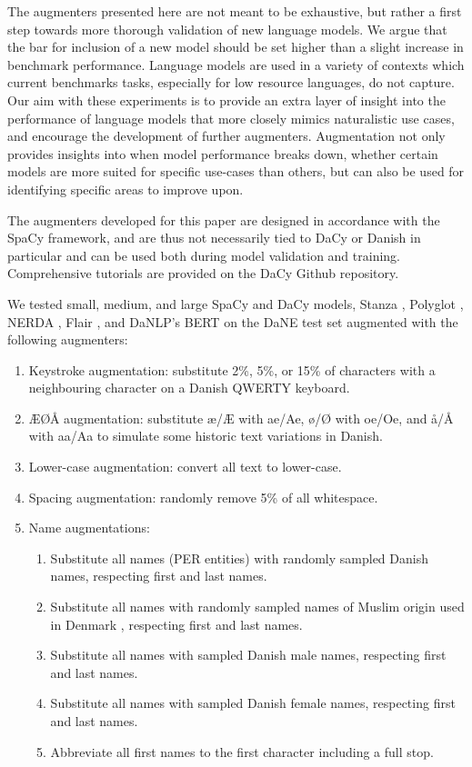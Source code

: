 \documentclass{article}
\begin{document}
The augmenters presented here are not meant to be exhaustive, but rather a first step towards more thorough validation of new language models. We argue that the bar for inclusion of a new model should be set higher than a slight increase in benchmark performance. Language models are used in a variety of contexts which current benchmarks tasks, especially for low resource languages, do not capture. Our aim with these experiments is to provide an extra layer of insight into the performance of language models that more closely mimics naturalistic use cases, and encourage the development of further augmenters. Augmentation not only provides insights into when model performance breaks down, whether certain models are more suited for specific use-cases than others, but can also be used for identifying specific areas to improve upon.

The augmenters developed for this paper are designed in accordance with the SpaCy framework, and are thus not necessarily tied to DaCy or Danish in particular and can be used both during model validation and training. Comprehensive tutorials are provided on the DaCy Github repository.

We tested small, medium, and large SpaCy \parencite{honnibal_spacy_2020} and DaCy models, Stanza \parencite{qi_stanza_2020}, Polyglot \parencite{al-rfou_polyglot_2013}, NERDA \parencite{kjeldgaard_nerda_2020}, Flair \parencite{akbik_flair_2019}, and DaNLP's BERT \parencite{brogaard_pauli_danlp_2021} on the DaNE test set augmented with the following augmenters:

\begin{enumerate}
    \item Keystroke augmentation: substitute 2\%, 5\%, or 15\% of characters with a neighbouring character on a Danish QWERTY keyboard.
    \item ÆØÅ augmentation: substitute æ/Æ with ae/Ae, ø/Ø with oe/Oe, and å/Å with aa/Aa to simulate some historic text variations in Danish.
    \item Lower-case augmentation: convert all text to lower-case.
    \item Spacing augmentation: randomly remove 5\% of all whitespace.
    \item Name augmentations:
    \begin{enumerate}
        \item Substitute all names (PER entities) with randomly sampled Danish names, respecting first and last names.
        \item Substitute all names with randomly sampled names of Muslim origin used in Denmark \parencite{meldgaard_muslimske_2005}, respecting first and last names.
        \item Substitute all names with sampled Danish male names, respecting first and last names.
        \item Substitute all names with sampled Danish female names, respecting first and last names.
        \item Abbreviate all first names to the first character including a full stop.
    \end{enumerate}
\end{enumerate}
\end{document}
